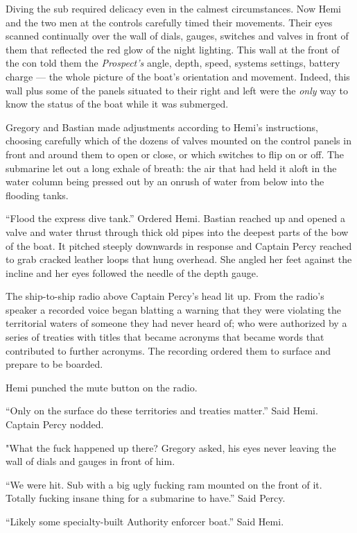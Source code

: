 \documentclass[]{scrbook}
\begin{document}
Diving the sub required delicacy even in the calmest circumstances. Now
Hemi and the two men at the controls carefully timed their movements.
Their eyes scanned continually over the wall of dials, gauges, switches
and valves in front of them that reflected the red glow of the night
lighting. This wall at the front of the con told them the
\emph{Prospect's} angle, depth, speed, systems settings, battery charge
--- the whole picture of the boat's orientation and movement. Indeed,
this wall plus some of the panels situated to their right and left were
the \emph{only} way to know the status of the boat while it was
submerged.

Gregory and Bastian made adjustments according to Hemi's instructions,
choosing carefully which of the dozens of valves mounted on the control
panels in front and around them to open or close, or which switches to
flip on or off. The submarine let out a long exhale of breath: the air
that had held it aloft in the water column being pressed out by an
onrush of water from below into the flooding tanks.

``Flood the express dive tank.'' Ordered Hemi. Bastian reached up and
opened a valve and water thrust through thick old pipes into the deepest
parts of the bow of the boat. It pitched steeply downwards in response
and Captain Percy reached to grab cracked leather loops that hung
overhead. She angled her feet against the incline and her eyes followed
the needle of the depth gauge.

The ship-to-ship radio above Captain Percy's head lit up. From the
radio's speaker a recorded voice began blatting a warning that they were
violating the territorial waters of someone they had never heard of; who
were authorized by a series of treaties with titles that became acronyms
that became words that contributed to further acronyms. The recording
ordered them to surface and prepare to be boarded.

Hemi punched the mute button on the radio.

``Only on the surface do these territories and treaties matter.'' Said
Hemi. Captain Percy nodded.

"What the fuck happened up there? Gregory asked, his eyes never leaving
the wall of dials and gauges in front of him.

``We were hit. Sub with a big ugly fucking ram mounted on the front of
it. Totally fucking insane thing for a submarine to have.'' Said Percy.

``Likely some specialty-built Authority enforcer boat.'' Said Hemi.
\end{document}

